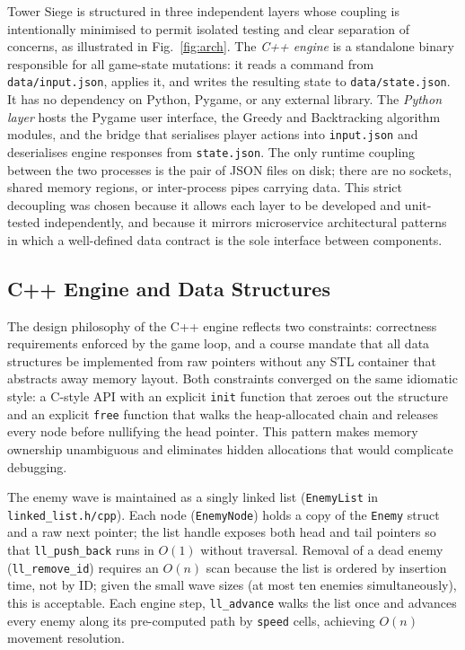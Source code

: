 \documentclass[conference]{IEEEtran}
\begin{document}
Tower Siege is structured in three independent layers whose coupling is
intentionally minimised to permit isolated testing and clear separation of
concerns, as illustrated in Fig.~\ref{fig:arch}.
The \emph{C++ engine} is a standalone binary responsible for all game-state
mutations: it reads a command from \texttt{data/input.json}, applies it, and
writes the resulting state to \texttt{data/state.json}.
It has no dependency on Python, Pygame, or any external library.
The \emph{Python layer} hosts the Pygame user interface, the Greedy and
Backtracking algorithm modules, and the bridge that serialises player actions
into \texttt{input.json} and deserialises engine responses from
\texttt{state.json}.
The only runtime coupling between the two processes is the pair of JSON files
on disk; there are no sockets, shared memory regions, or inter-process pipes
carrying data.
This strict decoupling was chosen because it allows each layer to be developed
and unit-tested independently, and because it mirrors microservice architectural
patterns in which a well-defined data contract is the sole interface between
components.

\subsection{C++ Engine and Data Structures}

The design philosophy of the C++ engine reflects two constraints: correctness
requirements enforced by the game loop, and a course mandate that all data
structures be implemented from raw pointers without any STL container that
abstracts away memory layout.
Both constraints converged on the same idiomatic style: a C-style API with an
explicit \texttt{init} function that zeroes out the structure and an explicit
\texttt{free} function that walks the heap-allocated chain and releases every
node before nullifying the head pointer.
This pattern makes memory ownership unambiguous and eliminates hidden allocations
that would complicate debugging.

The enemy wave is maintained as a singly linked list (\texttt{EnemyList} in
\texttt{linked\_list.h/cpp}).
Each node (\texttt{EnemyNode}) holds a copy of the \texttt{Enemy} struct and a
raw next pointer; the list handle exposes both head and tail pointers so that
\texttt{ll\_push\_back} runs in $O(1)$ without traversal.
Removal of a dead enemy (\texttt{ll\_remove\_id}) requires an $O(n)$ scan
because the list is ordered by insertion time, not by ID; given the small
wave sizes (at most ten enemies simultaneously), this is acceptable.
Each engine step, \texttt{ll\_advance} walks the list once and advances every
enemy along its pre-computed path by \texttt{speed} cells, achieving $O(n)$
movement resolution.
\end{document}
